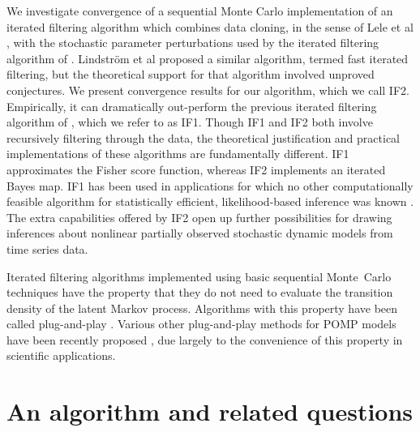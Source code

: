 \documentclass{pnastwo}\usepackage[]{graphicx}\usepackage[]{color}
\begin{document}
\begin{article}
We investigate convergence of a sequential Monte Carlo implementation of an iterated filtering algorithm which combines data cloning, in the sense of Lele et al \cite{lele07}, with the stochastic parameter perturbations used by the iterated filtering algorithm of \cite{ionides06-pnas}.
Lindstr\"{o}m et al \cite{lindstrom12} proposed a similar algorithm, termed {fast iterated filtering}, but the theoretical support for that algorithm involved unproved conjectures.
We present convergence results for our algorithm, which we call IF2.
Empirically, it can dramatically out-perform the previous iterated filtering algorithm of \cite{ionides06-pnas}, which we refer to as IF1.
Though IF1 and IF2 both involve recursively filtering through the data, the theoretical justification and practical implementations of these algorithms are fundamentally different. 
IF1 approximates the Fisher score function, whereas IF2 implements an iterated Bayes map.
IF1 has been used in applications for which no other computationally feasible algorithm for statistically efficient, likelihood-based inference was known
\cite{king08,laneri10,he10,blackwood13,shrestha13,blake14}. 
The extra capabilities offered by IF2 open up further possibilities for drawing inferences about nonlinear partially observed stochastic dynamic models from time series data.


Iterated filtering algorithms implemented using basic sequential Monte~Carlo techniques have the property that they do not need to evaluate the transition density of the latent Markov process.
Algorithms with this property have been called plug-and-play \cite{breto09,he10}. 
Various other plug-and-play methods for POMP models have been recently proposed \cite{andrieu10,toni09,wood10,shaman12}, due largely to the convenience of this property in scientific applications.

\section{An algorithm and related questions}  


\end{article}
\end{document}
